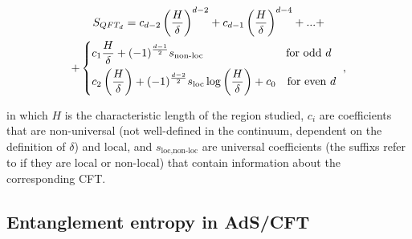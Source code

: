 \documentclass[twocolumn]{revtex4}
\providecommand{\eq}[2]{
    \begin{equation}
        #2
    \label{eq:#1}
    \end{equation}
}
\providecommand{\eqgat}[2]{
    \begin{gather}
        #2
    \label{eq:#1}
    \end{gather}
}
\begin{document}
\eqgat{EE}{
    S_{QFT_d} = c_{d-2} \left( \frac{H}{\delta} \right) ^{d-2} + c_{d-1} \left( \frac{H}{\delta} \right) ^{d-4} + ... + \nonumber \\
    + \begin{dcases}
        c_1 \frac{H}{\delta} + (-1)^{\frac{d-1}{2}} s_{\text{non-loc}}
        \qquad \qquad \qquad \quad \ \text{for odd } d \\
        c_2 \left ( \frac{H}{\delta} \right ) + (-1)^{\frac{d-2}{2}} s_{\text{loc}} \log \left ( \frac{H}{\delta} \right ) + c_0
        \quad \text{for even } d
    \end{dcases} \ ,
}
\cite{nishioka_entanglement_2018} in which $H$ is the characteristic length of the region studied, $c_i$ are coefficients that are non-universal (not well-defined in the continuum, dependent on the definition of $\delta$) and local, and $s_{\text{loc},\text{non-loc}}$ are universal coefficients (the suffixs refer to if they are local or non-local) that contain information about the corresponding CFT.


\subsection{Entanglement entropy in AdS/CFT} \label{ss:EE_AdS/CFT}
\end{document}
